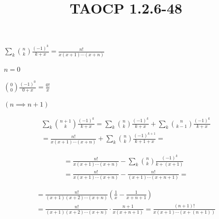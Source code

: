 \documentclass{article}
\title{TAOCP 1.2.6\mbox{-}48}
\begin{document}
\maketitle

\( \sum_{k} \binom{n}{k} \frac{{(-1)}^{k}}{k+x} = \frac{n!}{x(x+1)\cdots(x+n)} \)

\( n = 0 \)

\( \binom{0}{0} \frac{{(-1)}^{0}}{0+x} = \frac{0!}{x} \)

\( (n \implies n + 1) \)

\begin{multline*}
\sum_{k} \binom{n+1}{k} \frac{{(-1)}^{k}}{k+x} = \sum_{k} \binom{n}{k} \frac{{(-1)}^{k}}{k+x} + \sum_{k} \binom{n}{k-1} \frac{{(-1)}^{k}}{k+x} \\
= \frac{n!}{x(x+1)\cdots(x+n)} + \sum_{k} \binom{n}{k}\frac{{(-1)}^{k+1}}{k+1+x} =
\end{multline*}

\begin{multline*}
= \frac{n!}{x(x+1)\cdots(x+n)} - \sum_{k} \binom{n}{k}\frac{{(-1)}^{k}}{k+(x+1)} \\
= \frac{n!}{x(x+1)\cdots(x+n)} - \frac{n!}{(x+1)\cdots(x+n+1)} =
\end{multline*}

\begin{multline*}
= \frac{n!}{(x+1)(x+2)\cdots(x+n)} (\frac{1}{x} - \frac{1}{x+n+1}) \\
= \frac{n!}{(x+1)(x+2)\cdots(x+n)} \cdot \frac{n+1}{x(x+n+1)} = \frac{(n+1)!}{x(x+1)\cdots(x+(n+1))}
\end{multline*}
\end{document}
